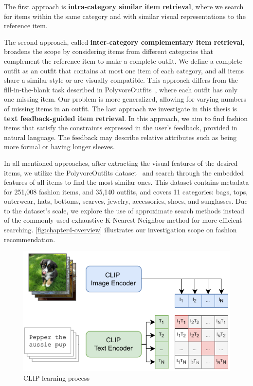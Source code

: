 The first approach is \textbf{intra-category similar item retrieval}, where we search for items within the same category and with similar visual representations to the reference item. 

The second approach, called \textbf{inter-category complementary item retrieval}, broadens the scope by considering items from different categories that complement the reference item to make a complete outfit. We define a complete outfit as an outfit that contains at most one item of each category, and all items share a similar style or are visually compatible. This approach differs from the fill-in-the-blank task described in PolyvoreOutfits~\cite{Mariya-ECCV18-Learning}, where each outfit has only one missing item. Our problem is more generalized, allowing for varying numbers of missing items in an outfit.
The last approach we investigate in this thesis is \textbf{text feedback-guided item retrieval}. In this approach, we aim to find fashion items that satisfy the constraints expressed in the user's feedback, provided in natural language. The feedback may describe relative attributes such as being more formal or having longer sleeves.  

In all mentioned approaches, after extracting the visual features of the desired items, we utilize the PolyvoreOutfits dataset~\cite{Mariya-ECCV18-Learning} and search through the embedded features of all items to find the most similar ones. This dataset contains metadata for 251,008 fashion items, and 35,140 outfits, and covers 11 categories: bags, tops, outerwear, hats, bottoms, scarves, jewelry, accessories, shoes, and sunglasses. Due to the dataset's scale, we explore the use of approximate search methods \cite{Sivic-ICCV2003-Video, Erik-Github-Annoy, Malkov-TPAMI2018-Efficient} instead of the commonly used exhaustive K-Nearest Neighbor method for more efficient searching. \autoref{fig:chapter4-overview} illustrates our investigation scope on fashion recommendation.

\begin{figure}[b]
    \centering
    \includegraphics{content/resources/images/fashion-recommendation/chapter4-clip.pdf}
    \caption{CLIP learning process}
    \label{fig:chapter4-clip}
\end{figure}

